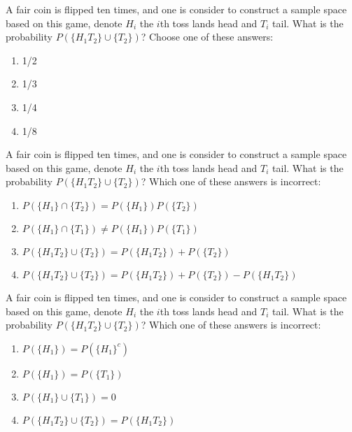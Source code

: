 \documentclass[poll_tutorial_format]{subfiles}
\begin{document}
	\begin{exercise}
	A fair coin is flipped ten times, and one is consider to construct a sample space based on this game, denote $H_i$ the $i$th toss lands head and $T_i$ tail. What is the probability $P( \{H_1T_2\} \cup \{T_2\} )$?
	Choose one of these answers:%
	\begin{enumerate}
		\item 1/2
		\item 1/3
		\item 1/4
		\item 1/8
	\end{enumerate}
\end{exercise}

	\begin{exercise}
	A fair coin is flipped ten times, and one is consider to construct a sample space based on this game, denote $H_i$ the $i$th toss lands head and $T_i$ tail. What is the probability $P( \{H_1T_2\} \cup \{T_2\} )$?
	Which one of these answers is incorrect:%
	\begin{enumerate}
		\item $P( \{H_1\} \cap \{T_2\} )=P( \{H_1\})P( \{T_2\} )$
		\item $P( \{H_1 \} \cap \{T_1\} )\neq  P( \{H_1\})P( \{T_1\} )$
		\item $P( \{H_1T_2\} \cup \{T_2\} )=P( \{H_1T_2\} )+P( \{T_2\} )$
		\item $P( \{H_1T_2\} \cup \{T_2\} )=P( \{H_1T_2\} )+P( \{T_2\} )-P( \{H_1T_2\} )$
	\end{enumerate}
\end{exercise}


	\begin{exercise}
	A fair coin is flipped ten times, and one is consider to construct a sample space based on this game, denote $H_i$ the $i$th toss lands head and $T_i$ tail. What is the probability $P( \{H_1T_2\} \cup \{T_2\} )$?
	Which one of these answers is incorrect:%
	\begin{enumerate}
		\item $P( \{H_1\})=P( \{H_1\}^c)$
		\item $P( \{H_1 \} )=P( \{T_1\} )$
		\item $P( \{H_1\} \cup \{T_1\} )=0$
		\item $P( \{H_1T_2\} \cup \{T_2\} )=P( \{H_1T_2\} ) $
	\end{enumerate}
\end{exercise}
\end{document}
